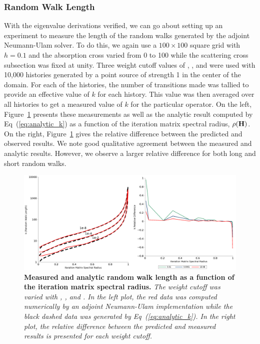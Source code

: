 \subsubsection{Random Walk Length}
\label{subsubsec:walk_length}
With the eigenvalue derivations verified, we can go about setting up
an experiment to measure the length of the random walks generated by
the adjoint Neumann-Ulam solver. To do this, we again use a $100
\times 100$ square grid with $h=0.1$ and the absorption cross varied
from 0 to 100 while the scattering cross subsection was fixed at
unity. Three weight cutoff values of , , and
 were used with 10,000 histories generated by a point source
of strength 1 in the center of the domain. For each of the histories,
the number of transitions made was tallied to provide an effective
value of $k$ for each history. This value was then averaged over all
histories to get a measured value of $k$ for the particular
operator. On the left, Figure~\ref{fig:measured_length} presents these
measurements as well as the analytic result computed by
Eq~(\ref{eq:analytic_k}) as a function of the iteration matrix
spectral radius, $\rho(\mathbf{H})$. On the right,
Figure~\ref{fig:measured_length} gives the relative difference between the
predicted and observed results. We note good qualitative agreement
between the measured and analytic results. However, we observe a
larger relative difference for both long and short random walks.
\begin{figure}[t!]
  \begin{spacing}{1.0}
    \begin{center}
      \includegraphics[width=6.0in,clip]{chapters/parallel_mc/measured_length_2.pdf}
    \end{center}
    \caption{\textbf{Measured and analytic random walk length as a
        function of the iteration matrix spectral radius.} \textit{The
        weight cutoff was varied with , , and
        . In the left plot, the red data was computed
        numerically by an adjoint Neumann-Ulam implementation while
        the black dashed data was generated by
        Eq~(\ref{eq:analytic_k}). In the right plot, the relative
        difference between the predicted and measured results is
        presented for each weight cutoff.}}
    \label{fig:measured_length}
  \end{spacing}
\end{figure}

